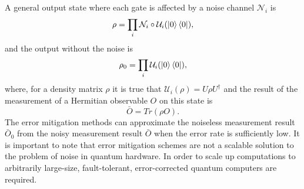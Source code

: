 A general output state where each gate is affected by a noise channel $\mathcal{N}_i$ is
\begin{equation}
    \rho = \prod_i \mathcal{N}_i \circ \mathcal{U}_i (\ket{0}\bra{0}),
\end{equation}
and the output without the noise is
\begin{equation}
    \rho_0 = \prod_i \mathcal{U}_i (\ket{0}\bra{0}),
\end{equation}
where, for a density matrix $\rho$ it is true that $\mathcal{U}_i(\rho) = U \rho U^{\dagger}$ and the result of the measurement of a Hermitian observable $O$ on this state is
\begin{equation}
    \bar{O} = Tr(\rho O).
\end{equation}
The error mitigation methods can approximate the noiseless measurement result $\bar{O}_0$ from the noisy measurement result $\bar{O}$ when the error rate is sufficiently low. It is important to note that error mitigation schemes are not a scalable solution to the problem of noise in quantum hardware. In order to scale up computations to arbitrarily large-size, fault-tolerant, error-corrected quantum computers are required.
